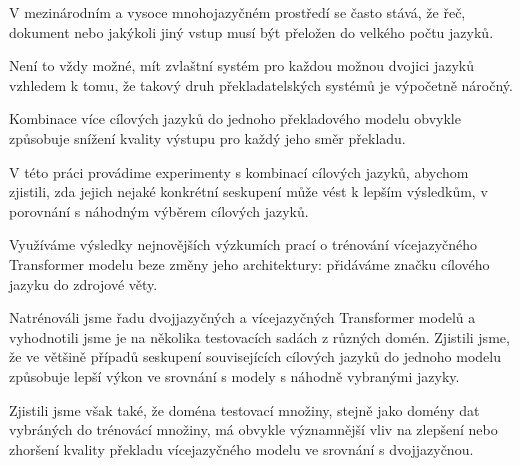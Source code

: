 \documentclass[12pt]{report}
\begin{document}

V mezinárodním a vysoce mnohojazyčném prostředí se často
stává, že řeč, dokument nebo jakýkoli jiný vstup musí být
přeložen do velkého počtu jazyků.

Není to vždy možné, mít zvlaštní systém pro každou možnou
dvojici jazyků vzhledem k tomu, že takový druh překladatelských
systémů je výpočetně náročný.

Kombinace více cílových jazyků do jednoho překladového modelu
obvykle způsobuje snížení kvality výstupu pro každý jeho směr
překladu.

V této práci provádime experimenty s kombinací cílových jazyků,
abychom zjistili, zda jejich nejaké konkrétní seskupení může vést
k lepším výsledkům, v porovnání s náhodným výběrem cílových jazyků.

Využíváme výsledky nejnovějších výzkumích prací o trénování
vícejazyčného Transformer modelu beze změny jeho architektury:
přidáváme značku cílového jazyku do zdrojové věty.

Natrénováli jsme řadu dvojjazyčných a vícejazyčných Transformer
modelů a vyhodnotili jsme je na několika testovacích sadách z
různých domén.
Zjistili jsme, že ve většině případů seskupení souvisejících
cílových jazyků do jednoho modelu způsobuje lepší výkon ve
srovnání s modely s náhodně vybranými jazyky.

Zjistili jsme však také, že doména testovací množiny, stejně jako
domény dat vybráných do trénovácí množiny, má obvykle významnější
vliv na zlepšení nebo zhoršení kvality překladu vícejazyčného modelu
ve srovnání s dvojjazyčnou.
\end{document}
